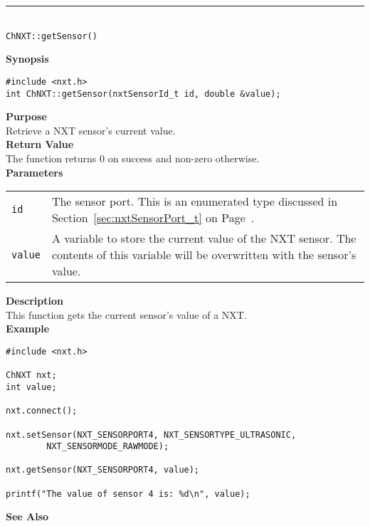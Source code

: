 \noindent
\vspace{5pt}
\rule{4.5in}{0.015in}\\
\noindent
{\LARGE \texttt{ChNXT::getSensor()}}\\
{}

\noindent
{\bf Synopsis}
\begin{lstlisting}
#include <nxt.h>
int ChNXT::getSensor(nxtSensorId_t id, double &value);
\end{lstlisting}

\noindent
{\bf Purpose}\\
Retrieve a NXT sensor's current value.\\

\noindent
{\bf Return Value}\\
The function returns 0 on success and non-zero otherwise.\\

\noindent
{\bf Parameters}\\
\vspace{-0.1in}
\begin{description}
\item               
\begin{tabular}{p{15 mm}p{145 mm}}
    {\tt id} & The sensor port. This is an enumerated type discussed in 
    Section~\ref{sec:nxtSensorPort_t} on Page~\pageref{sec:nxtSensorPort_t}.\\
    {\tt value} & A variable to store the current value of the NXT sensor. The 
    contents of this variable will be overwritten with the sensor's value.  \\
\end{tabular}
\end{description}

\noindent
{\bf Description}\\
This function gets the current sensor's value of a NXT.\\

\noindent
{\bf Example}
\begin{lstlisting}
#include <nxt.h>

ChNXT nxt;
int value;

nxt.connect();

nxt.setSensor(NXT_SENSORPORT4, NXT_SENSORTYPE_ULTRASONIC,
		NXT_SENSORMODE_RAWMODE);

nxt.getSensor(NXT_SENSORPORT4, value);

printf("The value of sensor 4 is: %d\n", value);
\end{lstlisting}

\noindent
{\bf See Also}\\

